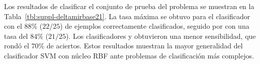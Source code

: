 %

Los resultados de clasificar el conjunto de prueba del problema
\prob\deltamirbase{} se muestran en la
Tabla~\ref{tbl:suppl-deltamirbase21}.
La tasa máxima se obtuvo para el clasificador  con el
$88\%$ ($22/25$) de ejemplos correctamente clasificados, seguido por
 con una tasa del $84\%$ ($21/25$).
Los clasificadores  y  obtuvieron una menor
sensibilidad, que rondó el $70\%$ de aciertos.
Estos resultados muestran la mayor generalidad del clasificador SVM
con núcleo RBF ante problemas de clasificación más complejos.
